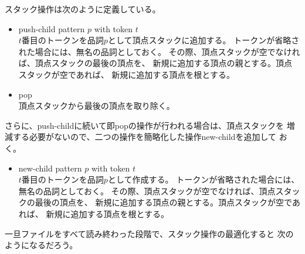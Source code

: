 	スタック操作は次のように定義している。
	\begin{itemize}\setlength{\itemsep}{-1mm} %
		\item push-child pattern $p$ with token $t$ \\
		$t$番目のトークンを品詞$p$として頂点スタックに追加する。
		トークンが省略された場合には、無名の品詞としておく。
		その際、頂点スタックが空でなければ、頂点スタックの最後の頂点を、
		新規に追加する頂点の親とする。頂点スタックが空であれば、
		新規に追加する頂点を根とする。
		\item pop \\
		頂点スタックから最後の頂点を取り除く。
	\end{itemize} %
	さらに、push-childに続いて即popの操作が行われる場合は、頂点スタックを
	増減する必要がないので、二つの操作を簡略化した操作new-childを追加して
	おく。
	\begin{itemize}\setlength{\itemsep}{-1mm} %
		\item new-child pattern $p$ with token $t$ \\
		$t$番目のトークンを品詞$p$として作成する。
		トークンが省略された場合には、無名の品詞としておく。
		その際、頂点スタックが空でなければ、頂点スタックの最後の頂点を、
		新規に追加する頂点の親とする。頂点スタックが空であれば、
		新規に追加する頂点を根とする。
	\end{itemize} %
	一旦ファイルをすべて読み終わった段階で、スタック操作の最適化すると
	次のようになるだろう。
